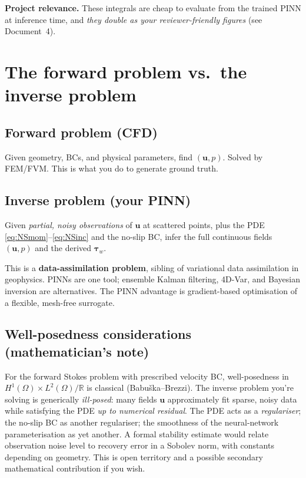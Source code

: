 \documentclass[11pt]{article}
\begin{document}
\textbf{Project relevance.} These integrals are cheap to evaluate from the trained PINN at inference time, and \emph{they double as your reviewer-friendly figures} (see Document~4).

\section{The forward problem vs.\ the inverse problem}

\subsection*{Forward problem (CFD)}
Given geometry, BCs, and physical parameters, find $(\mathbf{u}, p)$. Solved by FEM/FVM. This is what you do to generate ground truth.

\subsection*{Inverse problem (your PINN)}
Given \emph{partial, noisy observations} of $\mathbf{u}$ at scattered points, plus the PDE \eqref{eq:NSmom}--\eqref{eq:NSinc} and the no-slip BC, infer the full continuous fields $(\mathbf{u}, p)$ and the derived $\boldsymbol{\tau}_w$.

This is a \textbf{data-assimilation problem}, sibling of variational data assimilation in geophysics. PINNs are one tool; ensemble Kalman filtering, 4D-Var, and Bayesian inversion are alternatives. The PINN advantage is gradient-based optimisation of a flexible, mesh-free surrogate.

\subsection*{Well-posedness considerations (mathematician's note)}
For the forward Stokes problem with prescribed velocity BC, well-posedness in $H^1(\Omega)\times L^2(\Omega)/\mathbb{R}$ is classical (Babu\v{s}ka--Brezzi). The inverse problem you're solving is generically \emph{ill-posed}: many fields $\mathbf{u}$ approximately fit sparse, noisy data while satisfying the PDE \emph{up to numerical residual}. The PDE acts as a \emph{regulariser}; the no-slip BC as another regulariser; the smoothness of the neural-network parameterisation as yet another. A formal stability estimate would relate observation noise level to recovery error in a Sobolev norm, with constants depending on geometry. This is open territory and a possible secondary mathematical contribution if you wish.
\end{document}
